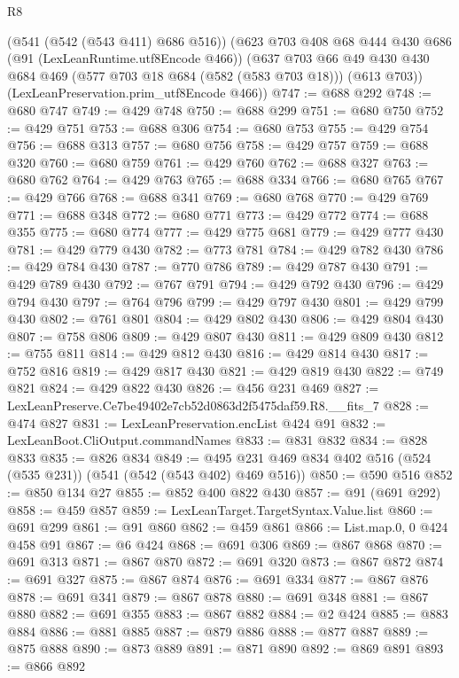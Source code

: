 \begin{lexlean}{R8}
\begin{coremodule}
    (@541 (@542 (@543 @411) @686 @516))
    (@623
      @703
      @408
      @68
      @444
      @430
      @686
      (@91 (LexLeanRuntime.utf8Encode @466))
      (@637
        @703
        @66
        @49
        @430
        @430
        @684
        @469
        (@577 @703 @18 @684 (@582 (@583 @703 @18)))
        (@613 @703))
      (LexLeanPreservation.prim_utf8Encode @466))
@747 := @688 @292
@748 := @680 @747
@749 := @429 @748
@750 := @688 @299
@751 := @680 @750
@752 := @429 @751
@753 := @688 @306
@754 := @680 @753
@755 := @429 @754
@756 := @688 @313
@757 := @680 @756
@758 := @429 @757
@759 := @688 @320
@760 := @680 @759
@761 := @429 @760
@762 := @688 @327
@763 := @680 @762
@764 := @429 @763
@765 := @688 @334
@766 := @680 @765
@767 := @429 @766
@768 := @688 @341
@769 := @680 @768
@770 := @429 @769
@771 := @688 @348
@772 := @680 @771
@773 := @429 @772
@774 := @688 @355
@775 := @680 @774
@777 := @429 @775 @681
@779 := @429 @777 @430
@781 := @429 @779 @430
@782 := @773 @781
@784 := @429 @782 @430
@786 := @429 @784 @430
@787 := @770 @786
@789 := @429 @787 @430
@791 := @429 @789 @430
@792 := @767 @791
@794 := @429 @792 @430
@796 := @429 @794 @430
@797 := @764 @796
@799 := @429 @797 @430
@801 := @429 @799 @430
@802 := @761 @801
@804 := @429 @802 @430
@806 := @429 @804 @430
@807 := @758 @806
@809 := @429 @807 @430
@811 := @429 @809 @430
@812 := @755 @811
@814 := @429 @812 @430
@816 := @429 @814 @430
@817 := @752 @816
@819 := @429 @817 @430
@821 := @429 @819 @430
@822 := @749 @821
@824 := @429 @822 @430
@826 := @456 @231 @469
@827 := LexLeanPreserve.Ce7be49402e7cb52d0863d2f5475daf59.R8.__fits_7
@828 := @474 @827
@831 := LexLeanPreservation.encList @424 @91
@832 := LexLeanBoot.CliOutput.commandNames
@833 := @831 @832
@834 := @828 @833
@835 := @826 @834
@849 := @495 @231 @469 @834 @402 @516 (@524 (@535 @231)) (@541 (@542 (@543 @402) @469 @516))
@850 := @590 @516
@852 := @850 @134 @27
@855 := @852 @400 @822 @430
@857 := @91 (@691 @292)
@858 := @459 @857
@859 := LexLeanTarget.TargetSyntax.Value.list
@860 := @691 @299
@861 := @91 @860
@862 := @459 @861
@866 := List.map.{0, 0} @424 @458 @91
@867 := @6 @424
@868 := @691 @306
@869 := @867 @868
@870 := @691 @313
@871 := @867 @870
@872 := @691 @320
@873 := @867 @872
@874 := @691 @327
@875 := @867 @874
@876 := @691 @334
@877 := @867 @876
@878 := @691 @341
@879 := @867 @878
@880 := @691 @348
@881 := @867 @880
@882 := @691 @355
@883 := @867 @882
@884 := @2 @424
@885 := @883 @884
@886 := @881 @885
@887 := @879 @886
@888 := @877 @887
@889 := @875 @888
@890 := @873 @889
@891 := @871 @890
@892 := @869 @891
@893 := @866 @892

\end{coremodule}
\end{lexlean}
